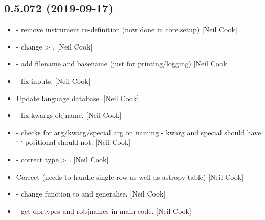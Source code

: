 \documentclass[a4paper,10pt,english]{report}
\begin{document}
\subsection{0.5.072 (2019-09-17)}
\label{\detokenize{misc/changelog:id70}}\begin{itemize}
\item {} 
 - remove instrument re-definition (now done in
core.setup) {[}Neil Cook{]}

\item {} 
 - change  \textendash{}\textgreater{} . {[}Neil
Cook{]}

\item {} 
 - add filename and basename (just for
printing/logging) {[}Neil Cook{]}

\item {} 
 - fix inputs. {[}Neil Cook{]}

\item {} 
Update language database. {[}Neil Cook{]}

\item {} 
 - fix kwargs \textendash{}objname.
{[}Neil Cook{]}

\item {} 
 - checks for arg/kwarg/special arg on naming
- kwarg and special should have ‘-‘ positional should not. {[}Neil Cook{]}

\item {} 
 - correct type  \textendash{}\textgreater{}
. {[}Neil Cook{]}

\item {} 
Correct  (needs to handle single row as well as astropy
table) {[}Neil Cook{]}

\item {} 
 - change function  to
 and generalise. {[}Neil Cook{]}

\item {} 
 - get dprtypes and robjnames
in main code. {[}Neil Cook{]}


\end{itemize}
\end{document}
